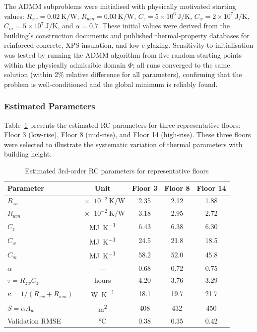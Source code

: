 \documentclass[11pt]{article}
\providecommand{\W}{\watt}
\providecommand{\J}{\joule}
\providecommand{\MJ}{\mega\joule}
\providecommand{\K}{\kelvin}
\providecommand{\m}{\metre}
\begin{document}
The ADMM subproblems were initialised with physically motivated starting values: $R_{zw}=0.02\ \si{\K\per\W}$, $R_{wm}=0.03\ \si{\K\per\W}$, $C_z=5\times10^6\ \si{\J\per\K}$, $C_w=2\times10^7\ \si{\J\per\K}$, $C_m=5\times10^7\ \si{\J\per\K}$, and $\alpha=0.7$. These initial values were derived from the building's construction documents and published thermal-property databases for reinforced concrete, XPS insulation, and low-e glazing. Sensitivity to initialisation was tested by running the ADMM algorithm from five random starting points within the physically admissible domain $\Phi$; all runs converged to the same solution (within 2\% relative difference for all parameters), confirming that the problem is well-conditioned and the global minimum is reliably found.

\subsubsection{Estimated Parameters}

Table~\ref{tab:rc_params} presents the estimated RC parameters for three representative floors: Floor 3 (low-rise), Floor 8 (mid-rise), and Floor 14 (high-rise). These three floors were selected to illustrate the systematic variation of thermal parameters with building height.

\begin{table}[!htbp]
\centering
\caption{Estimated 3rd-order RC parameters for representative floors}
\label{tab:rc_params}
\begin{tabular}{lcccc}
\toprule
Parameter & Unit & Floor 3 & Floor 8 & Floor 14 \\
\midrule
$R_{zw}$ & $\SI{e-2}{\K\per\W}$ & 2.35 & 2.12 & 1.88 \\
$R_{wm}$ & $\SI{e-2}{\K\per\W}$ & 3.18 & 2.95 & 2.72 \\
$C_z$ & \si{\MJ\per\K} & 6.43 & 6.38 & 6.30 \\
$C_w$ & \si{\MJ\per\K} & 24.5 & 21.8 & 18.5 \\
$C_m$ & \si{\MJ\per\K} & 58.2 & 52.0 & 45.8 \\
$\alpha$ & — & 0.68 & 0.72 & 0.75 \\
\midrule
$\tau=R_{zw}C_z$ & hours & 4.20 & 3.76 & 3.29 \\
$\kappa=1/(R_{zw}+R_{wm})$ & \si{\W\per\K} & 18.1 & 19.7 & 21.7 \\
$S=\alpha A_w$ & \si{\square\m} & 408 & 432 & 450 \\
Validation RMSE & \si{\celsius} & 0.38 & 0.35 & 0.42 \\
\bottomrule
\end{tabular}
\end{table}
\end{document}
